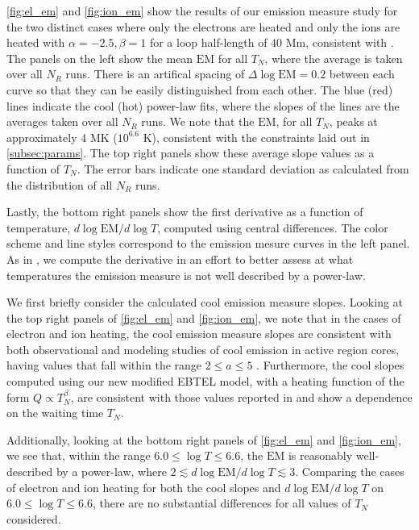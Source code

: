 \documentclass[apj]{emulateapj}
\begin{document}
	\par \autoref{fig:el_em} and \autoref{fig:ion_em} show the results of our emission measure study for the two distinct cases where only the electrons are heated and only the ions are heated with $\alpha=-2.5,\beta=1$ for a loop half-length of $40$ Mm, consistent with . The panels on the left show the mean $\mathrm{EM}$ for all $T_N$, where the average is taken over all $N_{R}$ runs. There is an artifical spacing of $\Delta\log{\mathrm{EM}}=0.2$ between each curve so that they can be easily distinguished from each other. The blue (red) lines indicate the cool (hot) power-law fits, where the slopes of the lines are the averages taken over all $N_{R}$ runs. We note that the $\mathrm{EM}$, for all $T_N$, peaks at approximately 4 MK ($10^{6.6}$ K), consistent with the constraints laid out in \autoref{subsec:params}. The top right panels show these average slope values as a function of $T_N$. The error bars indicate one standard deviation as calculated from the distribution of all $N_{R}$ runs.
	\par Lastly, the bottom right panels show the first derivative as a function of temperature, $d\log{\mathrm{EM}}/d\log{T}$, computed using central differences. The color scheme and line styles correspond to the emission mesure curves in the left panel. As in , we compute the derivative in an effort to better assess at what temperatures the emission measure is not well described by a power-law.
	\par We first briefly consider the calculated cool emission measure slopes. Looking at the top right panels of \autoref{fig:el_em} and \autoref{fig:ion_em}, we note that in the cases of electron and ion heating, the cool emission measure slopes are consistent with both observational and modeling studies of cool emission in active region cores, having values that fall within the range $2\le a\le5$ \citep[and references therein]{bradshaw_diagnosing_2012}. Furthermore, the cool slopes computed using our new modified EBTEL model, with a heating function of the form $Q\propto T_N^{\beta}$, are consistent with those values reported in \citet{cargill_active_2014} and show a dependence on the waiting time $T_N$.  
	\par Additionally, looking at the bottom right panels of \autoref{fig:el_em} and \autoref{fig:ion_em}, we see that, within the range $6.0\le\log{T}\le6.6$, the $\mathrm{EM}$ is reasonably well-described by a power-law, where $2\lesssim d\log{\mathrm{EM}/d\log{T}}\lesssim3$. Comparing the cases of electron and ion heating for both the cool slopes and $d\log{\mathrm{EM}/d\log{T}}$ on $6.0\le\log{T}\le6.6$, there are no substantial differences for all values of $T_N$ considered.
\end{document}
